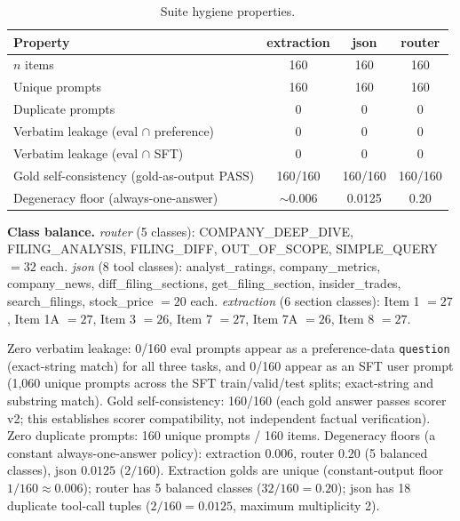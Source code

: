 \begin{table}[H]
\centering
\small
\caption{Suite hygiene properties.}
\begin{tabular}{@{}lccc@{}}
\toprule
Property & extraction & json & router\\
\midrule
$n$ items & 160 & 160 & 160\\
Unique prompts & 160 & 160 & 160\\
Duplicate prompts & 0 & 0 & 0\\
Verbatim leakage (eval $\cap$ preference) & 0 & 0 & 0\\
Verbatim leakage (eval $\cap$ SFT) & 0 & 0 & 0\\
Gold self-consistency (gold-as-output PASS) & 160/160 & 160/160 & 160/160\\
Degeneracy floor (always-one-answer) & ${\sim}0.006$ & 0.0125 & 0.20\\
\bottomrule
\end{tabular}
\end{table}

\textbf{Class balance.} \emph{router} (5 classes): COMPANY\_DEEP\_DIVE, FILING\_ANALYSIS, FILING\_DIFF, OUT\_OF\_SCOPE, SIMPLE\_QUERY $= 32$ each. \emph{json} (8 tool classes): analyst\_ratings, company\_metrics, company\_news, diff\_filing\_sections, get\_filing\_section, insider\_trades, search\_filings, stock\_price $= 20$ each. \emph{extraction} (6 section classes): Item 1 $=27$, Item 1A $=27$, Item 3 $=26$, Item 7 $=27$, Item 7A $=26$, Item 8 $=27$.

Zero verbatim leakage: 0/160 eval prompts appear as a preference-data \texttt{question} (exact-string match) for all three tasks, and 0/160 appear as an SFT user prompt (1{,}060 unique prompts across the SFT train/valid/test splits; exact-string and substring match). Gold self-consistency: 160/160 (each gold answer passes scorer v2; this establishes scorer compatibility, not independent factual verification). Zero duplicate prompts: 160 unique prompts / 160 items. Degeneracy floors (a constant always-one-answer policy): extraction $0.006$, router $0.20$ (5 balanced classes), json $0.0125$ ($2/160$). Extraction golds are unique (constant-output floor $1/160 \approx 0.006$); router has 5 balanced classes ($32/160 = 0.20$); json has 18 duplicate tool-call tuples ($2/160 = 0.0125$, maximum multiplicity 2).

